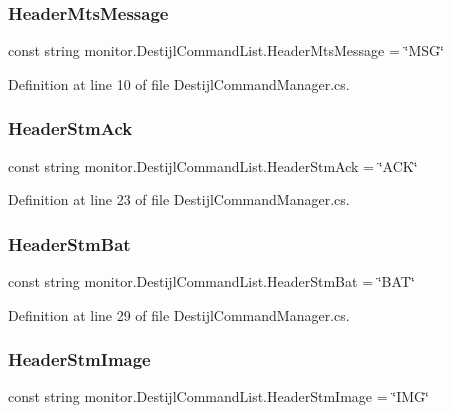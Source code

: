 \subsubsection{Header\+Mts\+Message}
{\footnotesize\ttfamily const string monitor.\+Destijl\+Command\+List.\+Header\+Mts\+Message = \char`\"{}M\+SG\char`\"{}}



Definition at line 10 of file Destijl\+Command\+Manager.\+cs.

\mbox{\label{classmonitor_1_1_destijl_command_list_af494d7e1bddee8184873dc380a3066ba}} 
\subsubsection{Header\+Stm\+Ack}
{\footnotesize\ttfamily const string monitor.\+Destijl\+Command\+List.\+Header\+Stm\+Ack = \char`\"{}A\+CK\char`\"{}}



Definition at line 23 of file Destijl\+Command\+Manager.\+cs.

\mbox{\label{classmonitor_1_1_destijl_command_list_a88de91fa6abdc122245ceb26fc21fd33}} 
\subsubsection{Header\+Stm\+Bat}
{\footnotesize\ttfamily const string monitor.\+Destijl\+Command\+List.\+Header\+Stm\+Bat = \char`\"{}B\+AT\char`\"{}}



Definition at line 29 of file Destijl\+Command\+Manager.\+cs.

\mbox{\label{classmonitor_1_1_destijl_command_list_ae3ee8e0ecbb79faec9d24095d72cfbde}} 
\subsubsection{Header\+Stm\+Image}
{\footnotesize\ttfamily const string monitor.\+Destijl\+Command\+List.\+Header\+Stm\+Image = \char`\"{}I\+MG\char`\"{}}




